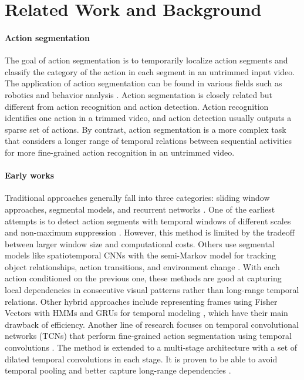 \newcommand{\red}[1]{{\color{red}{#1}}}


\section{Related Work and Background}
\paragraph{Action segmentation} The goal of action segmentation is to temporarily localize action segments and classify the category of the action in each segment in an untrimmed input video. The application of action segmentation can be found in various fields such as robotics \cite{robotics_action_seg} and behavior analysis \cite{shao2012human}. Action segmentation is closely related but different from action recognition and action detection. Action recognition identifies one action in a trimmed video, and action detection usually outputs a sparse set of actions. By contrast, action segmentation is a more complex task that considers a longer range of temporal relations between sequential activities for more fine-grained action recognition in an untrimmed video.

\paragraph{Early works}
Traditional approaches generally fall into three categories: sliding window approaches, segmental models, and recurrent networks \cite{graphbased2020}. One of the earliest attempts is to detect action segments with temporal windows of different scales and non-maximum suppression \cite{6247801}. However, this method is limited by the tradeoff between larger window size and computational costs. Others use segmental models like spatiotemporal CNNs with the semi-Markov model for tracking object relationships, action transitions, and environment change \cite{lea2016segmental, 6619177}. With each action conditioned on the previous one, these methods are good at capturing local dependencies in consecutive visual patterns rather than long-range temporal relations. Other hybrid approaches include representing frames using Fisher Vectors with HMMs and GRUs for temporal modeling \cite{7477701, 8099623}, which have their main drawback of efficiency. Another line of research focuses on temporal convolutional networks (TCNs) that perform fine-grained action segmentation using temporal convolutions \cite{8099596}. The method is extended to a multi-stage architecture with a set of dilated temporal
convolutions in each stage. It is proven to be able to avoid temporal pooling and better capture long-range dependencies \cite{8953830}.  

